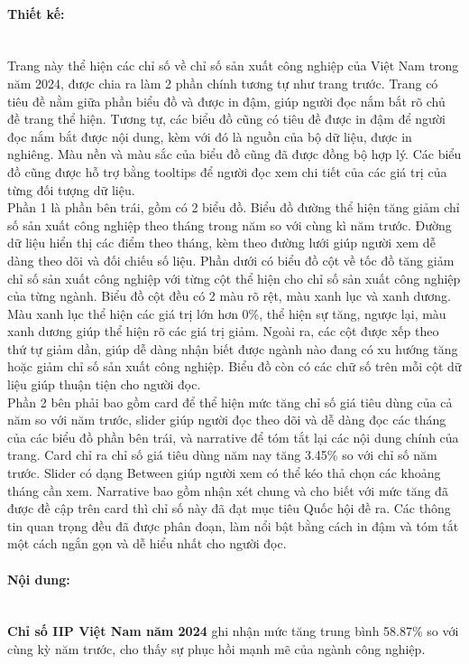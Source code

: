\documentclass[a4paper]{report}
\begin{document}
{{\paragraph{Thiết kế: } \mbox{}\\
Trang này thể hiện các chỉ số về chỉ số sản xuất công nghiệp của Việt Nam trong năm 2024, được chia ra làm 2 phần chính tương tự như trang trước. Trang có tiêu đề nằm giữa phần biểu đồ và được in đậm, giúp người đọc nắm bắt rõ chủ đề trang thể hiện. Tương tự, các biểu đồ cũng có tiêu đề được in đậm để người đọc nắm bắt được nội dung, kèm với đó là nguồn của bộ dữ liệu, được in nghiêng. Màu nền và màu sắc của biểu đồ cũng đã được đồng bộ hợp lý. Các biểu đồ cũng được hỗ trợ bằng tooltips để người đọc xem chi tiết của các giá trị của từng đối tượng dữ liệu. \\
Phần 1 là phần bên trái, gồm có 2 biểu đồ. Biểu đồ đường thể hiện tăng giảm chỉ số sản xuất công nghiệp theo tháng trong năm so với cùng kì năm trước. Đường dữ liệu hiển thị các điểm theo tháng, kèm theo đường lưới giúp người xem dễ dàng theo dõi và đối chiếu số liệu. Phần dưới có biểu đồ cột về tốc đồ tăng giảm chỉ số sản xuất công nghiệp với từng cột thể hiện cho chỉ số sản xuất công nghiệp của từng ngành. Biểu đồ cột đều có 2 màu rõ rệt, màu xanh lục và xanh dương. Màu xanh lục thể hiện các giá trị lớn hơn 0\%, thể hiện sự tăng, ngược lại, màu xanh dương giúp thể hiện rõ các giá trị giảm. Ngoài ra, các cột được xếp theo thứ tự giảm dần, giúp dễ dàng nhận biết được ngành nào đang có xu hướng tăng hoặc giảm chỉ số sản xuất công nghiệp. Biểu đồ còn có các chữ số trên mỗi cột dữ liệu giúp thuận tiện cho người đọc. \\
Phần 2 bên phải bao gồm card để thể hiện mức tăng chỉ số giá tiêu dùng của cả năm so với năm trước, slider giúp người đọc theo dõi và dễ dàng đọc các tháng của các biểu đồ phần bên trái, và narrative để tóm tắt lại các nội dung chính của trang. Card chỉ ra chỉ số giá tiêu dùng năm nay tăng 3.45\% so với chỉ số năm trước. Slider có dạng Between giúp người xem có thể kéo thả chọn các khoảng tháng cần xem. Narrative bao gồm nhận xét chung và cho biết với mức tăng đã được đề cập trên card thì chỉ số này đã đạt mục tiêu Quốc hội đề ra. Các thông tin quan trọng đều đã được phân đoạn, làm nổi bật bằng cách in đậm và tóm tắt một cách ngắn gọn và dễ hiểu nhất cho người đọc.

\paragraph{Nội dung: } \mbox{}\\
\textbf{Chỉ số IIP Việt Nam năm 2024} ghi nhận mức tăng trung bình 58.87\% so với cùng kỳ năm trước, cho thấy sự phục hồi mạnh mẽ của ngành công nghiệp.

}}
\end{document}
